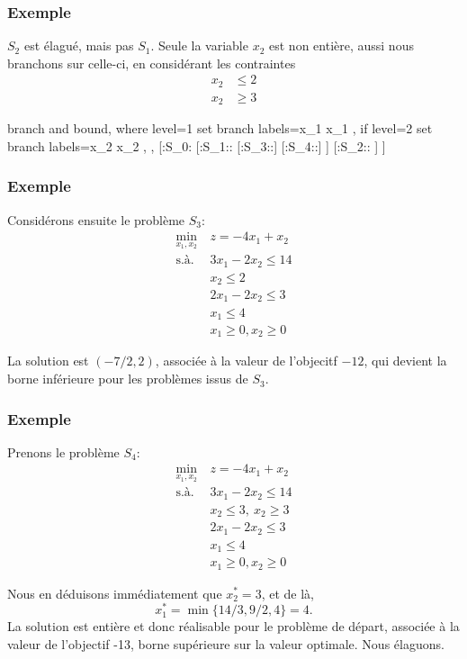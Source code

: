 \documentclass[usepdftitle=false, aspectratio=169]{beamer}
\newcommand{\extraprotect}[1]{\unexpanded{\unexpanded{#1}}}
\begin{document}
\begin{frame}
	\frametitle{Exemple}

$S_2$ est élagué, mais pas $S_1$. Seule la variable $x_2$ est non entière, aussi nous branchons sur celle-ci, en considérant les contraintes
	\begin{align*}
		x_2 &\leq 2 \\
		x_2 &\geq 3
	\end{align*}
	
	\begin{center}
		\begin{forest}
			branch and bound,
			where level=1{
				set branch labels={x_1 }{}{x_1 }{},
			}{
				if level=2{
					set branch labels={x_2 }{}{x_2 }{},
				}{},
			}
			[\extraprotect{\big($\frac{9}{2}$,3\big)}:S_0:\extraprotect{$-15 \leq z^* \leq +\infty$}
			[\extraprotect{\big(4,$\frac{5}{2}$\big)}:S_1:\extraprotect{$-13 \leq z^* \leq +\infty$}:
			[:S_3::]
			[:S_4::]
			]
			[:S_2:\extraprotect{non réalisable}:
			]
			]
		\end{forest}
	\end{center}
	
\end{frame}

\begin{frame}
	\frametitle{Exemple}
	
	Considérons ensuite le problème $S_3$:
	\begin{align*}
		\min_{x_1,x_2} \ & z = -4x_1+x_2 \\
		\mbox{s.à. } & 3x_1 - 2x_2 \leq 14 \\ 
		& x_2 \leq 2 \\
		& 2x_1 - 2x_2 \leq 3 \\
		& x_1 \leq 4 \\
		& x_1 \geq 0, x_2 \geq 0
	\end{align*}
	
	La solution est $(-7/2, 2)$, associée à la valeur de l'objecitf $-12$, qui devient la borne inférieure pour les problèmes issus de $S_3$.
	
\end{frame}


\begin{frame}
	\frametitle{Exemple}
	
	Prenons le problème $S_4$:
	\begin{align*}
		\min_{x_1,x_2} \ & z = -4x_1+x_2 \\
		\mbox{s.à. } & 3x_1 - 2x_2 \leq 14 \\ 
		& x_2 \leq 3,\ x_2 \geq 3 \\
		& 2x_1 - 2x_2 \leq 3 \\
		& x_1 \leq 4 \\
		& x_1 \geq 0, x_2 \geq 0
	\end{align*}

Nous en déduisons immédiatement que $x_2^* = 3$, et de là,
$$
x_1^* = \min \{ 14/3, 9/2, 4 \} = 4.
$$
La solution est entière et donc réalisable pour le problème de départ, associée à la valeur de l'objectif -13, borne supérieure sur la valeur optimale. Nous élaguons.

\end{frame}
\end{document}
